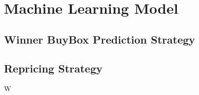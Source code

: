 \section{Machine Learning Model}
\label{sec:MLModel}

\subsection{Winner BuyBox Prediction Strategy}
\label{sec:BuyBoxPrediction}



\subsection{Repricing Strategy}
\label{sec:RepricingStrategy}

W